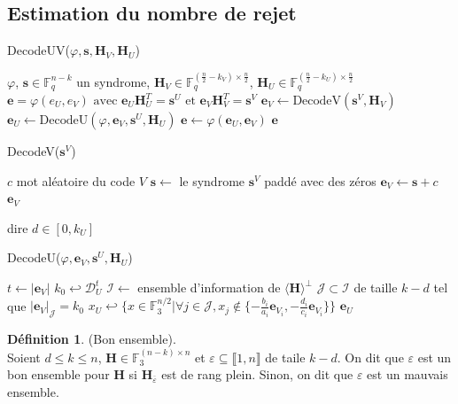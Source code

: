 \documentclass[12pt]{article}
\theoremstyle{definition}
\newtheorem{defi}[thm]{Définition}
\newcommand{\F}{\mathbb{F}}
\newcommand{\e}{\mathbf{e}}
\newcommand{\s}{\mathbf{s}}
\newcommand{\J}{\mathcal{J}}
\begin{document}
\subsection{Estimation du nombre de rejet}
\begin{algorithm}
	\caption{DecodeUV($\varphi, \s, \mathbf{H}_V, \mathbf{H}_U$)}
	\begin{algorithmic}[1]
   	 	\REQUIRE $\varphi$, $\s \in \F_q^{n-k}$ un syndrome, $\mathbf{H}_V \in \F_q^{(\frac{n}{2} - k_V) \times \frac{n}{2}}$, $\mathbf{H}_U \in \F_q^{(\frac{n}{2} - k_U) \times \frac{n}{2}}$
   	 	\ENSURE $\e = \varphi(e_U, e_V) \text{ avec } \e_U\mathbf{H}_U^T = \s^U \text{ et } \e_V\mathbf{H}_V^T = \s^V$
    	\STATE $\e_V \leftarrow \text {DecodeV}(\s^V,\mathbf{H}_V)$
    	\REPEAT 
    	\STATE $\e_U \leftarrow \text {DecodeU}(\varphi, \e_V, \s^U, \mathbf{H}_U)$
    	\STATE $\e \leftarrow \varphi(\e_U,\e_V)$
    	\UNTIL {$\text{rand}([0,1]) > \mathbf{r}_U(|\e_V|, m_1(\e)$}
    	\RETURN $\e$
    \end{algorithmic}
\end{algorithm}


\begin{algorithm}
	\caption{DecodeV($\s^V$)}
	\begin{algorithmic}[1]
    	\STATE $c$ mot aléatoire du code $V$
    	\STATE $\s \leftarrow$ le syndrome $\s^V$ paddé avec des zéros
    	\STATE $\e_V \leftarrow \s + c$
    	\RETURN $\e_V$
    \end{algorithmic}
\end{algorithm}

dire $d\in [0,k_U]$

\begin{algorithm}
	\caption{DecodeU($\varphi, \e_V, \s^U, \mathbf{H}_U$)}
	\begin{algorithmic}[1]
		\STATE $t \leftarrow |\e_V|$
		\STATE $k_0 \hookleftarrow \mathcal{D}_U^t$
		\REPEAT
		\STATE $\mathcal{I} \leftarrow$ ensemble d'information de $\langle\mathbf{H}\rangle^\perp$
		\STATE $\mathcal{J} \subset \mathcal{I}$ de taille $k-d$ tel que $|\e_V|_\mathcal{J} = k_0$
		\STATE $x_U \hookleftarrow \{x\in\F_3^{n/2} | \forall j\in\J,  x_j \notin \{-\frac{b_i}{a_i}\e_{V_i}, -\frac{d_i}{c_i}\e_{V_i}\}\}$
		\UNTIL {$|\varphi(\e_U,\e_V)| \neq \omega$}
		\RETURN $\e_U$
    \end{algorithmic}
\end{algorithm}

\begin{defi} (Bon ensemble).\\
Soient $d \leq k \leq n$, $\mathbf{H}\in\F_3^{(n-k)\times n}$ et $\varepsilon \subseteq \llbracket1,n\rrbracket$ de taile $k-d$. On dit que $\varepsilon$ est un bon ensemble pour $\mathbf{H}$ si $\mathbf{H}_{\overline{\varepsilon}}$ est de rang plein. Sinon, on dit que $\varepsilon$ est un mauvais ensemble.
\end{defi}
\end{document}
